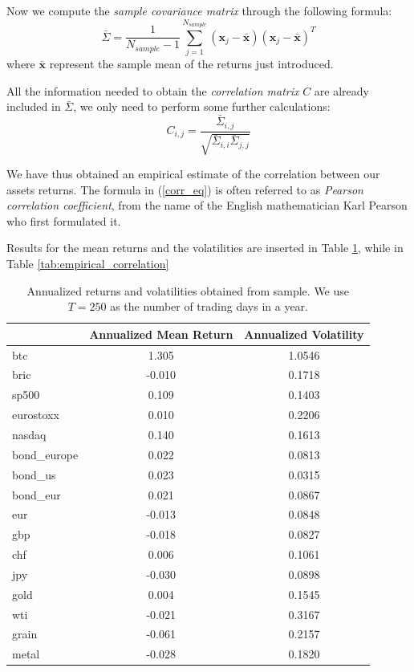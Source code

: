 Now we compute the \textit{sample covariance matrix} through the following formula:
\begin{equation*}
\bar{\Sigma}  = \frac{1}{N_{sample}-1} \sum_{j=1}^{N_{sample}} (\mathbf{x}_j - \mathbf{\bar{x}}) (\mathbf{x}_j - \mathbf{\bar{x}})^T
\end{equation*}
where $\mathbf{\bar{x}}$ represent the sample mean of the returns just introduced.
	
All the information needed to obtain the \textit{correlation matrix} $C$ are already included in $\bar{\Sigma}$, we only need to perform some further calculations:
\begin{equation}
\label{corr_eq}
	C_{i,j} = \frac{\bar{\Sigma}_{i,j}}{\sqrt{\bar{\Sigma}_{i,i} \bar{\Sigma}_{j,j}}}
\end{equation}

We have thus obtained an empirical estimate of the correlation between our assets returns. The formula in (\ref{corr_eq}) is often referred to as \textit{Pearson correlation coefficient}, from the name of the English mathematician Karl Pearson who first formulated it.

Results for the mean returns and the volatilities are inserted in Table \ref{tab:sample_ret_vol}, while in Table \ref{tab:empirical_correlation}


\begin{table}
	\centering
	\caption[Annualized mean returns and volatilities from sample]{Annualized returns and volatilities obtained from sample. We use $T = 250$ as the number of trading days in a year.}
	\label{tab:sample_ret_vol}
	\begin{tabular}{lcc}
		& Annualized Mean Return & Annualized Volatility \\
		\midrule
		btc & 1.305 & 1.0546 \\
		bric & -0.010 & 0.1718 \\
		sp500 & 0.109 & 0.1403 \\
		eurostoxx & 0.010 & 0.2206 \\
		nasdaq & 0.140 & 0.1613 \\
		bond\_europe & 0.022 & 0.0813 \\
		bond\_us & 0.023 & 0.0315 \\
		bond\_eur & 0.021 & 0.0867 \\
		eur & -0.013 & 0.0848 \\
		gbp & -0.018 & 0.0827 \\
		chf & 0.006 & 0.1061 \\
		jpy & -0.030 & 0.0898 \\
		gold & 0.004 & 0.1545 \\
		wti & -0.021 & 0.3167 \\
		grain & -0.061 & 0.2157 \\
		metal & -0.028 & 0.1820 \\
		\midrule
	\end{tabular}
\end{table}

